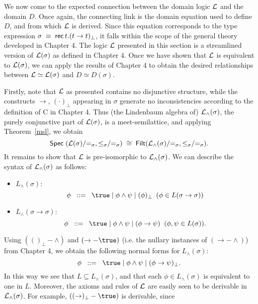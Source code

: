 We now come to the expected connection between the domain logic $\cal L$ 
and the domain $D$. 
Once again, the connecting link is the domain equation used to define $D$, 
and from which $\cal L$ is derived. 
Since this equation corresponds to the type expression 
$\sigma \; \equiv \; {\sf rec} \, t. (t \rightarrow t)_{\bot}$, 
it falls within the scope of the general theory developed in Chapter 4. 
The logic $\cal L$ presented in this section is a streamlined version of 
${\cal L}(\sigma )$ as defined in Chapter 4. 
Once we have shown that $\cal L$ is equivalent to  ${\cal L}(\sigma )$, we 
can apply the results of Chapter 4 to obtain the desired relationships between 
${\cal L} \simeq {\cal L}(\sigma )$ and $D \simeq D(\sigma )$.

Firstly, note that $\cal L$ as presented contains no disjunctive structure, 
while the constructs $\rightarrow$, $(\cdot )_{\bot}$ appearing in $\sigma$ 
generate no inconsistencies according to the definition of {\sf C} in Chapter 4. 
Thus (the Lindenbaum algebra of) ${\cal L}_{\wedge}(\sigma )$, 
the purely conjunctive part of ${\cal L}(\sigma )$, is a meet-semilattice, 
and applying Theorem~\ref{msl}, we obtain
\[ {\sf Spec} \; ({\cal L}(\sigma )/{=_{\sigma}}, {\leq_{\sigma}}/{=_{\sigma}}) \; \cong \; {\sf Filt}({\cal L}_{\wedge}(\sigma )/{=_{\sigma}}, {\leq_{\sigma}}/{=_{\sigma}}) . \]
It remains to show that $\cal L$ is pre-isomorphic to 
${\cal L}_{\wedge}(\sigma )$. 
We can describe the syntax of ${\cal L}_{\wedge}(\sigma )$ as follows:
\begin{itemize}
\item  $L_{\wedge}(\sigma )$:
\[ \phi \;\; ::= \;\; \true \; | \; \phi \wedge \psi \; | \; (\phi )_{\bot} \;\; (\phi \in L(\sigma \rightarrow \sigma )) \]
\item $L_{\wedge}(\sigma \rightarrow \sigma )$:
\[ \phi \;\; ::= \;\; \true \; | \; \phi \wedge \psi \; | \; (\phi \rightarrow \psi) \;\; (\phi , \psi \in L(\sigma )). \] 
\end{itemize}
Using $(()_{\bot}-\wedge )$ and $(\rightarrow -\true )$ (i.e. the nullary instances of $(\rightarrow - \wedge )$) from Chapter 4, we obtain the following normal forms for $L_{\wedge}(\sigma )$:
\[ \phi \;\; ::= \;\; \true \; | \; \phi \wedge \psi \; | \; (\phi \rightarrow \psi )_{\bot} . \]
In this way we see that $L \subseteq L_{\wedge}(\sigma )$, and that each $\phi \in L_{\wedge}(\sigma )$ is equivalent to one in $L$. 
Moreover, the axioms and rules of $\cal L$ are easily seen to be derivable in ${\cal L}_{\wedge}(\sigma )$. 
For example, $((\rightarrow )_{\bot}-\true )$ is derivable, since
